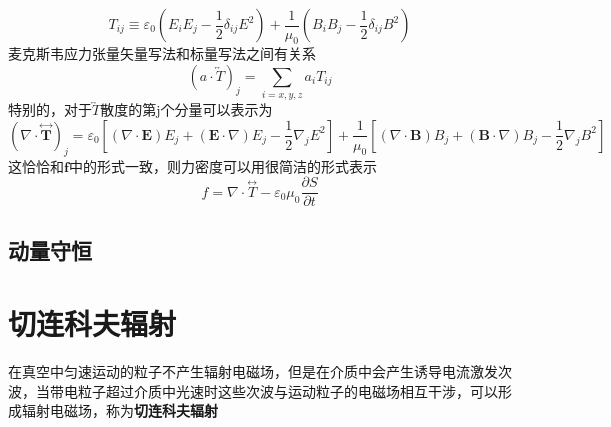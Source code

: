         \begin{equation}
            T_{i j} \equiv \varepsilon_{0}\left(E_{i} E_{j}-\frac{1}{2} \delta_{i j} E^{2}\right)+\frac{1}{\mu_{0}}\left(B_{i} B_{j}-\frac{1}{2} \delta_{i j} B^{2}\right)
        \end{equation}
        麦克斯韦应力张量矢量写法和标量写法之间有关系
        \begin{equation}
            (a \cdot \overleftrightarrow{T})_{j}=\sum_{i=x, y, z} a_{i} T_{i j}
        \end{equation}
        特别的，对于$\overleftrightarrow{T}$散度的第j个分量可以表示为
        \begin{equation}
            (\nabla \cdot \stackrel{\leftrightarrow}{\boldsymbol{T}})_{j}=\varepsilon_{0}\left[(\nabla \cdot \boldsymbol{E}) E_{j}+(\boldsymbol{E} \cdot \nabla) E_{j}-\frac{1}{2} \nabla_{j} E^{2}\right]+\frac{1}{\mu_{0}}\left[(\nabla \cdot \boldsymbol{B}) B_{j}+(\boldsymbol{B} \cdot \nabla) B_{j}-\frac{1}{2} \nabla_{j} B^{2}\right]
        \end{equation}
        这恰恰和$\boldsymbol{f}$中的形式一致，则力密度可以用很简洁的形式表示
        \begin{equation}
            f=\nabla \cdot \stackrel{\leftrightarrow}{T}-\varepsilon_{0} \mu_{0} \frac{\partial S}{\partial t}
        \end{equation}
    \subsection{动量守恒}  
\section{切连科夫辐射}
    在真空中匀速运动的粒子不产生辐射电磁场，但是在介质中会产生诱导电流激发次波，当带电粒子超过介质中光速时这些次波与运动粒子的电磁场相互干涉，可以形成辐射电磁场，称为\textbf{切连科夫辐射}
     